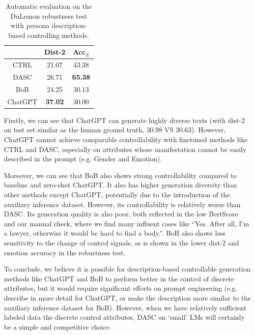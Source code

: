 \begin{table}[h]
    \small
    \centering
    \begin{tabular}{ccc}
    \hline
            & Dist-2         & Acc$_E$         \\ \hline
    CTRL    & 21.07          & 43.38          \\
    DASC    & 26.71          & \textbf{65.38} \\ \hline
    BoB     & 24.25          & 30.13          \\
    ChatGPT & \textbf{37.02} & 30.00          \\ \hline
    \end{tabular}
    \caption{Automatic evaluation on the DuLemon robustness test with persona description-based controlling methods.}
    \label{tab:desc_control_robust}
\end{table}

Firstly, we can see that ChatGPT can generate highly diverse texts (with dist-2 on test set similar as the human ground truth, 30.98 VS 30.63). However, ChatGPT cannot achieve comparable controllability with finetuned methods like CTRL and DASC, especially on attributes whose manifestation cannot be easily described in the prompt (e.g. Gender and Emotion). 

Moreover, we can see that BoB also shows strong controllability compared to baseline and zero-shot ChatGPT. It also has higher generation diversity than other methods except ChatGPT, potentially due to the introduction of the auxiliary inference dataset. However, its controllability is relatively worse than DASC. Its generation quality is also poor, both reflected in the low BertScore and our manual check, where we find many influent cases like ``Yes. After all, I'm a lawyer, otherwise it would be hard to find a body.''. BoB also shows less sensitivity to the change of control signals, as is shown in the lower dist-2 and emotion accuracy in the robustness test. 

To conclude, we believe it is possible for description-based controllable generation methods like ChatGPT and BoB to perform better in the control of discrete attributes, but it would require significant efforts on prompt engineering (e.g. describe in more detail for ChatGPT, or make the description more similar to the auxiliary inference dataset for BoB). However, when we have relatively sufficient labeled data the discrete control attributes, DASC on `small' LMs will certainly be a simple and competitive choice.

